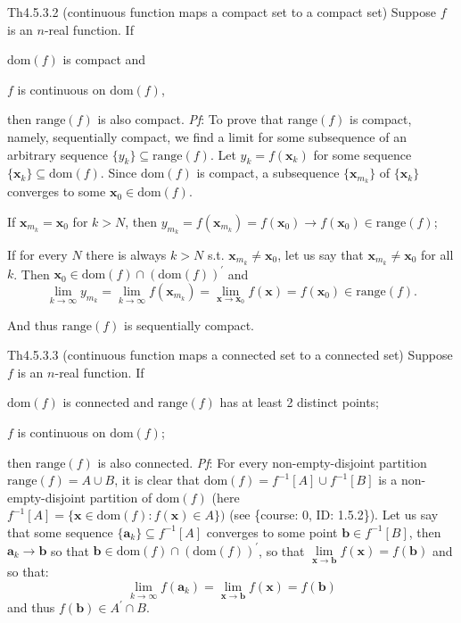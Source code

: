 \documentclass{article}
\begin{document}
\begin{Th}{Th4.5.3.2 (continuous function maps a compact set to a compact set)}
    Suppose $f$ is an $n$-real function. If
    \begin{compactenum}
        \item $\text{dom}(f)$ is compact and
        \item $f$ is continuous on $\text{dom}(f)$,
    \end{compactenum}
    then $\text{range}(f)$ is also compact.
    \tcblower
    \textit{Pf}: To prove that $\text{range}(f)$ is compact, namely, sequentially compact, we find a limit for some subsequence of an arbitrary sequence $\{y_k\}\subseteq\text{range}(f)$. Let $y_k = f(\pmb{x}_k)$ for some sequence $\{\pmb{x}_k\}\subseteq\text{dom}(f)$. Since $\text{dom}(f)$ is compact, a subsequence $\{\pmb{x}_{m_k}\}$ of $\{\pmb{x}_k\}$ converges to some $\pmb{x}_0\in\text{dom}(f)$.
    \begin{compactenum}
        \item If $\pmb{x}_{m_k} = \pmb{x}_0$ for $k>N$, then $y_{m_k} = f(\pmb{x}_{m_k}) = f(\pmb{x}_0)\rightarrow f(\pmb{x}_0)\in\text{range}(f)$;
        \item If for every $N$ there is always $k>N$ s.t. $\pmb{x}_{m_k}\neq \pmb{x}_0$, let us say that $\pmb{x}_{m_k}\neq \pmb{x}_0$ for all $k$. Then $\pmb{x}_0\in\text{dom}(f)\cap (\text{dom}(f))^\prime$ and
        $$ \lim\limits_{k\to\infty} y_{m_k} = \lim\limits_{k\to\infty} f(\pmb{x}_{m_k}) = \lim\limits_{\pmb{x}\to\pmb{x}_0} f(\pmb{x}) = f(\pmb{x}_0)\in\text{range}(f). $$
    \end{compactenum}
    And thus $\text{range}(f)$ is sequentially compact.
\end{Th}

\begin{Th}{Th4.5.3.3 (continuous function maps a connected set to a connected set)}
    Suppose $f$ is an $n$-real function. If
    \begin{compactenum}
        \item $\text{dom}(f)$ is connected and $\text{range}(f)$ has at least 2 distinct points;
        \item $f$ is continuous on $\text{dom}(f)$;
    \end{compactenum}
    then $\text{range}(f)$ is also connected.
    \tcblower
    \textit{Pf}: For every non-empty-disjoint partition $\text{range}(f) = A\cup B$, it is clear that $\text{dom}(f) = f^{-1}[A]\cup f^{-1}[B]$ is a non-empty-disjoint partition of $\text{dom}(f)$ (here $f^{-1}[A] = \{\pmb{x}\in\text{dom}(f): f(\pmb{x})\in A\})$ (see \{course: 0, ID: 1.5.2\}). Let us say that some sequence $\{\pmb{a}_k\}\subseteq f^{-1}[A]$ converges to some point $\pmb{b}\in f^{-1}[B]$, then $\pmb{a}_k\rightarrow\pmb{b}$ so that $\pmb{b}\in\text{dom}(f)\cap(\text{dom}(f))^\prime$, so that $\lim\limits_{\pmb{x}\to\pmb{b}} f(\pmb{x}) = f(\pmb{b})$ and so that:
    $$ \lim\limits_{k\to\infty} f(\pmb{a}_k) = \lim\limits_{\pmb{x}\to\pmb{b}} f(\pmb{x}) = f(\pmb{b})$$
    and thus $f(\pmb{b})\in A^\prime\cap B$.
\end{Th}
\end{document}
